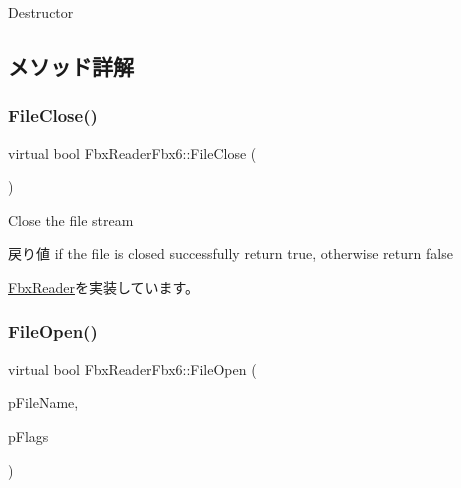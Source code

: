 Destructor 

\subsection{メソッド詳解}
\mbox{\label{class_fbx_reader_fbx6_a05230d40a8c8c2f62afee63f70a8d3be}} 
\subsubsection{\texorpdfstring{File\+Close()}{FileClose()}}
{\footnotesize\ttfamily virtual bool Fbx\+Reader\+Fbx6\+::\+File\+Close (\begin{DoxyParamCaption}{ }\end{DoxyParamCaption})\hspace{0.3cm}{\ttfamily [virtual]}}

Close the file stream \begin{DoxyReturn}{戻り値}
if the file is closed successfully return {\ttfamily true}, otherwise return {\ttfamily false} 
\end{DoxyReturn}


\hyperlink{class_fbx_reader_a327df94e5c24315fc5cbcedf0e7bb615}{Fbx\+Reader}を実装しています。

\mbox{\label{class_fbx_reader_fbx6_a9a28e37abe39c65e899a9c6f0b705756}} 
\subsubsection{\texorpdfstring{File\+Open()}{FileOpen()}\hspace{0.1cm}{\footnotesize\ttfamily [1/4]}}
{\footnotesize\ttfamily virtual bool Fbx\+Reader\+Fbx6\+::\+File\+Open (\begin{DoxyParamCaption}\item[{char $\ast$}]{p\+File\+Name,  }\item[{\hyperlink{class_fbx_reader_a1a14bd907bcda7dd48ba9b0a6236b7b8}{E\+File\+Open\+Special\+Flags}}]{p\+Flags }\end{DoxyParamCaption})\hspace{0.3cm}{\ttfamily [virtual]}}

